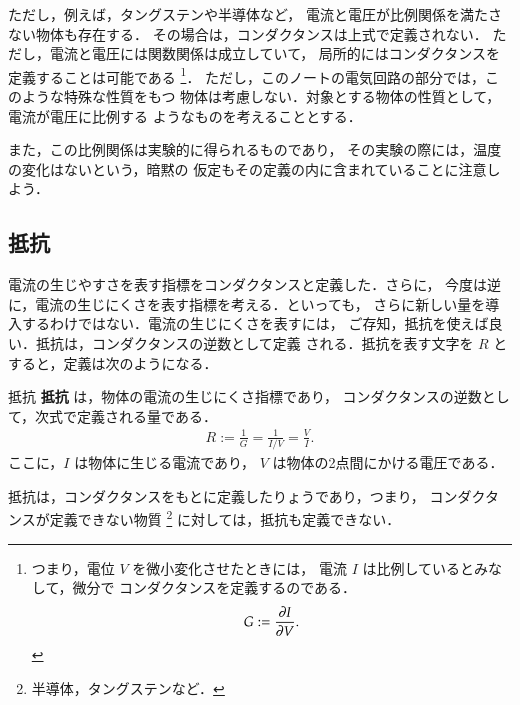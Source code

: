                ただし，例えば，タングステンや半導体など，
                電流と電圧が比例関係を満たさない物体も存在する．
                その場合は，コンダクタンスは上式で定義されない．
                ただし，電流と電圧には関数関係は成立していて，
                局所的にはコンダクタンスを定義することは可能である
                    \footnote{
                        つまり，電位 $V$ を微小変化させたときには，
                        電流 $I$ は比例しているとみなして，微分で
                        コンダクタンスを定義するのである．
                            \begin{align}
                                G := \frac{\partial I}{\partial V}.
                            \end{align}
                    }．
                ただし，このノートの電気回路の部分では，このような特殊な性質をもつ
                物体は考慮しない．対象とする物体の性質として，電流が電圧に比例する
                ようなものを考えることとする．

                また，この比例関係は実験的に得られるものであり，
                その実験の際には，温度の変化はないという，暗黙の
                仮定もその定義の内に含まれていることに注意しよう．

        \subsection{抵抗}
            電流の生じやすさを表す指標をコンダクタンスと定義した．さらに，
            今度は逆に，電流の生じにくさを表す指標を考える．といっても，
            さらに新しい量を導入するわけではない．電流の生じにくさを表すには，
            ご存知，抵抗を使えば良い．抵抗は，コンダクタンスの逆数として定義
            される．抵抗を表す文字を $R$ とすると，定義は次のようになる．
            \begin{myshadebox}{抵抗}
                \textbf{抵抗} は，物体の電流の生じにくさ指標であり，
                コンダクタンスの逆数として，次式で定義される量である．
                    \begin{align}\label{eq:teikouno_teigisiki}
                        R := \frac{1}{G} = \frac{1}{I/V}= \frac{V}{I}.
                    \end{align}
                ここに，$I$ は物体に生じる電流であり，
                $V$ は物体の2点間にかける電圧である．
            \end{myshadebox}

            抵抗は，コンダクタンスをもとに定義したりょうであり，つまり，
            コンダクタンスが定義できない物質
                \footnote{
                    半導体，タングステンなど．
                }
            に対しては，抵抗も定義できない．

